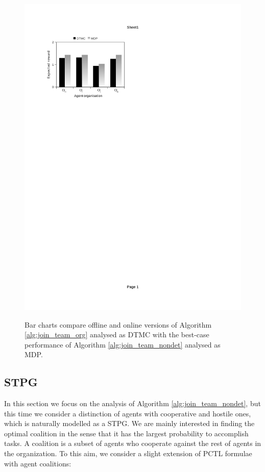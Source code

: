 \documentclass{llncs}
\begin{document}
\begin{figure}[H]
{\includegraphics[clip=true, trim=63 581.5 320 80, scale=0.77]{images/w2_mdp_online}
}
\caption{Bar charts compare offline and online versions of Algorithm \ref{alg:join_team_org} analysed as DTMC with the best-case performance of Algorithm \ref{alg:join_team_nondet} analysed as MDP. }
\end{figure}



\subsection{STPG}

In this section we focus on the analysis of Algorithm \ref{alg:join_team_nondet}, but this time we consider a distinction of agents with cooperative and hostile ones, which is  naturally modelled as a STPG. We are mainly interested in finding the optimal coalition in the sense that it has the largest probability to accomplish tasks. A coalition is a subset of agents who cooperate against the rest of agents in the organization. To this aim, we consider a slight extension of
PCTL formulae with agent coalitions:
\end{document}
